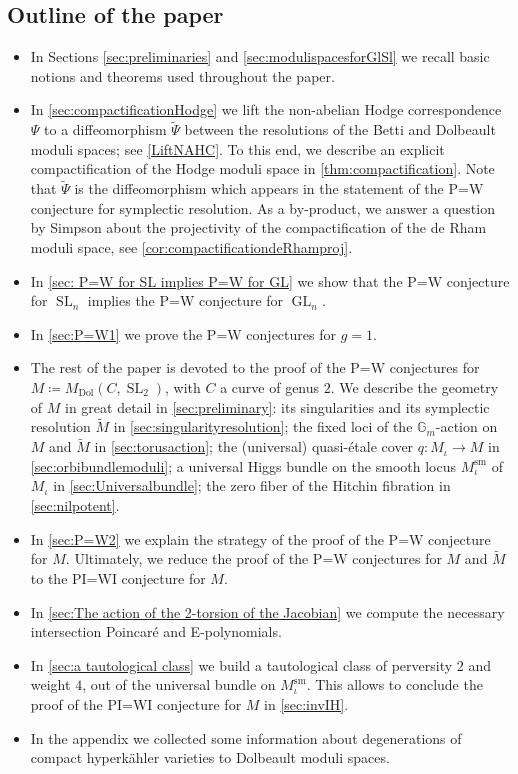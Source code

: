 \documentclass[11pt]{article}
\newcommand{\Subsection}{\subsection}
\theoremstyle{definition}
\newcommand{\Gm}{\mathbb{G}_m}
\newcommand{\Gl}{\operatorname{GL}}
\newcommand{\Sl}{\operatorname{SL}}
\begin{document}
\Subsection{Outline of the paper}
\begin{itemize}
\item In Sections \ref{sec:preliminaries} and \ref{sec:modulispacesforGlSl} we recall basic notions and theorems used throughout the paper.
\item In \cref{sec:compactificationHodge} we lift the non-abelian Hodge correspondence $\Psi$ to a diffeomorphism $\widetilde{\Psi}$ between the resolutions of the Betti and Dolbeault moduli spaces; see \cref{LiftNAHC}. To this end, we describe an explicit compactification of the Hodge moduli space in \cref{thm:compactification}. Note that $\widetilde{\Psi}$ is the diffeomorphism which appears in the statement of the P=W conjecture for symplectic resolution. As a by-product, we answer a question by Simpson about the projectivity of the compactification of the de Rham moduli space, see \cref{cor:compactificationdeRhamproj}.
\item In \cref{sec: P=W for SL implies P=W for GL} we show that the P=W conjecture for $\Sl_n$ implies the P=W conjecture for $\Gl_n$.\enlargethispage{1\baselineskip}%
\item In \cref{sec:P=W1} we prove the P=W conjectures for $g=1$.
\item The rest of the paper is devoted to the proof of the P=W conjectures for $M \coloneqq M_{\mathrm{Dol}}(C, \Sl_2)$, with $C$ a curve of genus $2$. We describe the geometry of $M$ in great detail in \cref{sec:preliminary}: its singularities and its symplectic resolution $\widetilde{M}$ in \cref{sec:singularityresolution}; the fixed loci of the $\Gm$\nobreakdash-action on $M$ and $\widetilde{M}$ in \cref{sec:torusaction}; the (universal) quasi-étale cover $q\colon M_{\iota} \to M$ in \cref{sec:orbibundlemoduli}; a universal Higgs bundle on the smooth locus $M^{\mathrm{sm}}_{\iota}$ of $M_{\iota}$ in \cref{sec:Universalbundle}; the zero fiber of the Hitchin fibration in \cref{sec:nilpotent}.
\item In \cref{sec:P=W2} we explain the strategy of the proof of the P=W conjecture for $M$. Ultimately, we reduce the proof of the P=W conjectures for $M$ and $\widetilde{M}$ to the PI=WI conjecture for $M$.
\item In \cref{sec:The action of the 2-torsion of the Jacobian} we compute the necessary intersection Poincaré and E\nobreakdash-poly\-no\-mials.
\item In \cref{sec:a tautological class} we build a tautological class of perversity $2$ and weight $4$, out of the universal bundle on $M^{\mathrm{sm}}_{\iota}$. This allows to conclude the proof of the PI=WI conjecture for $M$ in \cref{sec:invIH}.
\item In the appendix we collected some information about degenerations of compact hyperkähler varieties to Dolbeault moduli spaces.
\end{itemize}
\end{document}
